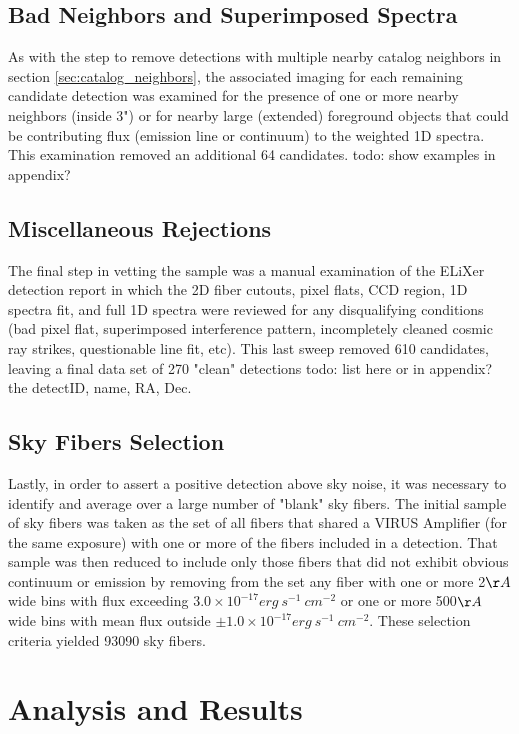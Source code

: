 \documentclass{aastex62}
\begin{document}
\subsection{Bad Neighbors and Superimposed Spectra}
As with the step to remove detections with multiple nearby catalog neighbors in section \ref{sec:catalog_neighbors}, the associated imaging for each remaining candidate detection was examined for the presence of one or more nearby neighbors (inside 3") or for nearby large (extended) foreground objects that could be contributing flux (emission line or continuum) to the weighted 1D spectra. This examination removed an additional 64 candidates.
{ \color{red} todo: show examples in appendix?}


\subsection{Miscellaneous Rejections}
The final step in vetting the sample was a manual examination of the ELiXer detection report in which the 2D fiber cutouts, pixel flats, CCD region, 1D spectra fit, and full 1D spectra were reviewed for any disqualifying conditions (bad pixel flat, superimposed interference pattern, incompletely cleaned cosmic ray strikes, questionable line fit, etc). This last sweep removed 610 candidates, leaving a final data set of 270 "clean" detections { \color{red} todo: list here or in appendix? the detectID, name, RA, Dec}.  


\subsection{Sky Fibers Selection}

Lastly, in order to assert a positive detection above sky noise, it was necessary to identify and average over a large number of "blank" sky fibers. The initial sample of sky fibers was taken as the set of all fibers that shared a VIRUS Amplifier (for the same exposure) with one or more of the fibers included in a detection. That sample was then reduced to include only those fibers that did not exhibit obvious continuum or emission by removing from the set any fiber with one or more 2$\AA$ wide bins with flux exceeding $3.0\times 10^{-17} erg\ s^{-1}\ cm^{-2}$ or one or more 500$\AA$ wide bins with mean flux outside $\pm 1.0 \times 10^{-17} erg\ s^{-1}\ cm^{-2}$. These selection criteria yielded 93090 sky fibers.  \\

\section{Analysis and Results} \label{sec:analysis}
\end{document}
